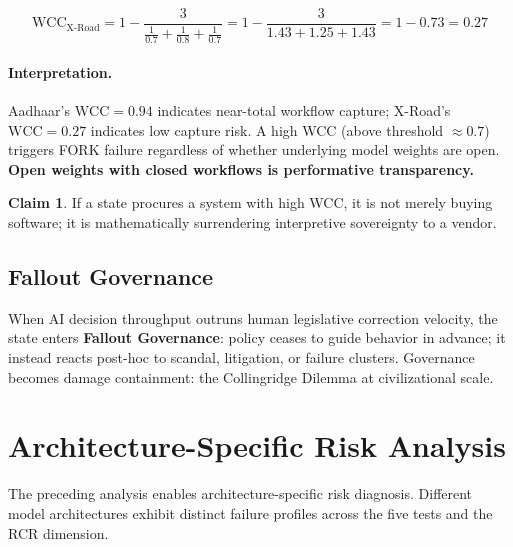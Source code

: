 \documentclass[11pt,a4paper]{article}
\theoremstyle{definition}
\newtheorem{claim}{Claim}[section]
\begin{document}
\begin{equation}
\text{WCC}_{\text{X-Road}} = 1 - \frac{3}{\frac{1}{0.7} + \frac{1}{0.8} + \frac{1}{0.7}} = 1 - \frac{3}{1.43 + 1.25 + 1.43} = 1 - 0.73 = \mathbf{0.27}
\end{equation}

\paragraph{Interpretation.} Aadhaar's $\text{WCC} = 0.94$ indicates near-total workflow capture; X-Road's $\text{WCC} = 0.27$ indicates low capture risk. A high WCC (above threshold $\approx 0.7$) triggers FORK failure regardless of whether underlying model weights are open. \textbf{Open weights with closed workflows is performative transparency.}

\begin{claim}
If a state procures a system with high WCC, it is not merely buying software; it is mathematically surrendering interpretive sovereignty to a vendor.
\end{claim}

\subsection{Fallout Governance}

When AI decision throughput outruns human legislative correction velocity, the state enters \textbf{Fallout Governance}: policy ceases to guide behavior in advance; it instead reacts post-hoc to scandal, litigation, or failure clusters. Governance becomes damage containment: the Collingridge Dilemma at civilizational scale.


\section{Architecture-Specific Risk Analysis}
\label{sec:architecture}

The preceding analysis enables architecture-specific risk diagnosis. Different model architectures exhibit distinct failure profiles across the five tests and the RCR dimension.
\end{document}
